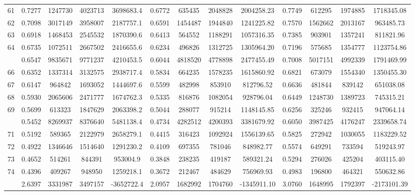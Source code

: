 \documentclass[
  12pt,
]{article}
\begin{document}
\begin{longtable}[t]{lcccccccccccc}
61 & 0.7277 & 1247730 & 4023713 & 3698683.4 & 0.6772 & 635435 & 2048828 & 2004258.23 & 0.7749 & 612295 & 1974885 & 1718345.08\\
62 & 0.7098 & 3017149 & 3958007 & 2187757.1 & 0.6591 & 1454487 & 1944840 & 1241225.82 & 0.7570 & 1562662 & 2013167 & 963485.73\\
63 & 0.6918 & 1468453 & 2545532 & 1870390.6 & 0.6413 & 564552 & 1188291 & 1057316.35 & 0.7385 & 903901 & 1357241 & 811821.96\\
64 & 0.6735 & 1072511 & 2667502 & 2416655.6 & 0.6234 & 496826 & 1312725 & 1305964.20 & 0.7196 & 575685 & 1354777 & 1123754.86\\
\addlinespace
65 & 0.6547 & 9835671 & 9771237 & 4210453.5 & 0.6044 & 4818520 & 4778898 & 2477455.49 & 0.7008 & 5017151 & 4992339 & 1791469.99\\
66 & 0.6352 & 1337314 & 3132575 & 2938717.4 & 0.5834 & 664235 & 1578235 & 1615860.92 & 0.6821 & 673079 & 1554340 & 1350455.30\\
67 & 0.6147 & 964842 & 1693052 & 1444697.6 & 0.5599 & 482998 & 853910 & 812796.52 & 0.6636 & 481844 & 839142 & 651038.08\\
68 & 0.5930 & 2065606 & 2471777 & 1674762.3 & 0.5335 & 816876 & 1082054 & 928796.04 & 0.6449 & 1248730 & 1389723 & 745315.21\\
69 & 0.5699 & 613323 & 1847629 & 2063398.2 & 0.5044 & 288077 & 915214 & 1148145.85 & 0.6256 & 325246 & 932415 & 947064.14\\
\addlinespace
70 & 0.5452 & 8269937 & 8376640 & 5481138.4 & 0.4734 & 4282512 & 4200393 & 3381679.92 & 0.6050 & 3987425 & 4176247 & 2339658.74\\
71 & 0.5192 & 589365 & 2122979 & 2658279.1 & 0.4415 & 316423 & 1092924 & 1556139.65 & 0.5825 & 272942 & 1030055 & 1183229.52\\
72 & 0.4922 & 1346646 & 1514640 & 1291230.2 & 0.4109 & 697355 & 781046 & 848982.77 & 0.5574 & 649291 & 733594 & 519243.97\\
73 & 0.4652 & 514261 & 844391 & 953004.9 & 0.3848 & 238235 & 419187 & 589321.24 & 0.5294 & 276026 & 425204 & 403115.40\\
74 & 0.4396 & 409267 & 948950 & 1259218.1 & 0.3672 & 212467 & 484629 & 756969.93 & 0.4983 & 196800 & 464321 & 550632.86\\
\addlinespace
75 & 2.6397 & 3331987 & 3497157 & -3652722.4 & 2.0957 & 1682992 & 1704760 & -1345911.10 & 3.0760 & 1648995 & 1792397 & -2173101.39\\*
\end{longtable}
\endgroup{}
\end{document}
